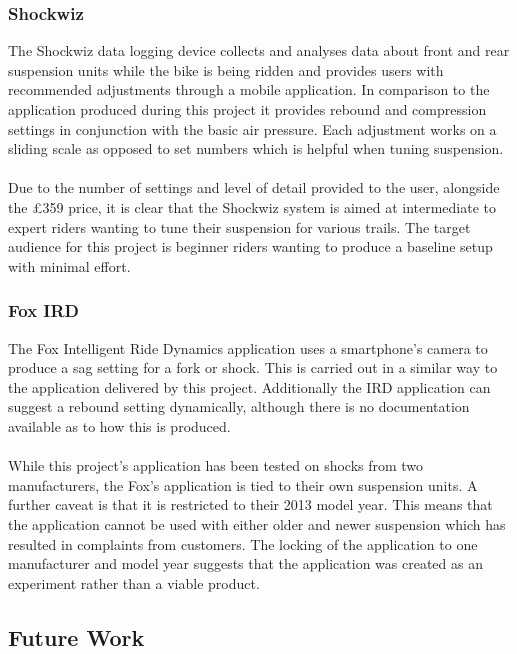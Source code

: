 		\subsubsection{Shockwiz}
			The Shockwiz data logging device \citep{quarq2017shockwiz} collects and analyses data about front and rear suspension units while the bike is being ridden and provides users with recommended adjustments through a mobile application. In comparison to the application produced during this project it provides rebound and compression settings in conjunction with the basic air pressure. Each adjustment works on a sliding scale as opposed to set numbers which is helpful when tuning suspension.
			\\\\
			Due to the number of settings and level of detail provided to the user, alongside the £359 price, it is clear that the Shockwiz system is aimed at intermediate to expert riders wanting to tune their suspension for various trails. The target audience for this project is beginner riders wanting to produce a baseline setup with minimal effort. 
		\subsubsection{Fox IRD}
			The Fox Intelligent Ride Dynamics application \cite{fox2015ird} uses a smartphone's camera to produce a sag setting for a fork or shock. This is carried out in a similar way to the application delivered by this project. Additionally the IRD application can suggest a rebound setting dynamically, although there is no documentation available as to how this is produced.
			\\\\
			While this project's application has been tested on shocks from two manufacturers, the Fox's application is tied to their own suspension units. A further caveat is that it is restricted to their 2013 model year. This means that the application cannot be used with either older and newer suspension which has resulted in complaints from customers. The locking of the application to one manufacturer and model year suggests that the application was created as an experiment rather than a viable product.
	\subsection{Future Work}\label{sec:conclusion_future_work}
